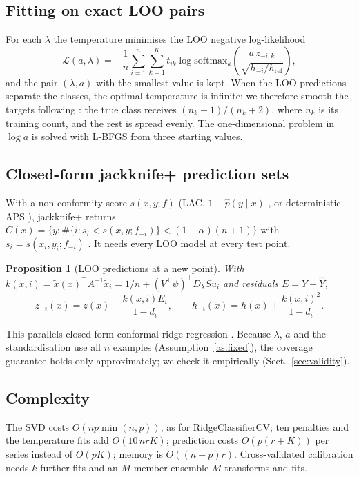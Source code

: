 \documentclass[preprint,12pt,authoryear]{elsarticle}
\newtheorem{proposition}{Proposition}
\begin{document}
\subsection{Fitting on exact LOO pairs}
For each $\lambda$ the temperature minimises the LOO negative log-likelihood
\begin{equation}\label{eq:fit}
\mathcal L(a,\lambda)=-\frac1n\sum_{i=1}^n\sum_{k=1}^K t_{ik}\log\mathrm{softmax}_k\!\left(\frac{a\,z_{-i,k}}{\sqrt{h_{-i}/h_{\mathrm{ref}}}}\right),
\end{equation}
and the pair $(\lambda,a)$ with the smallest value is kept. When the LOO predictions separate the classes, the optimal temperature is infinite; we therefore smooth the targets following \citet{platt1999}: the true class receives $(n_k+1)/(n_k+2)$, where $n_k$ is its training count, and the rest is spread evenly. The one-dimensional problem in $\log a$ is solved with L-BFGS from three starting values.

\subsection{Closed-form jackknife+ prediction sets}\label{sec:jackknife}
With a non-conformity score $s(x,y;f)$ (LAC, $1-\hat p(y\mid x)$ \citep{sadinle2019}, or deterministic APS \citep{romano2020}), jackknife+ returns $C(x)=\{y:\#\{i:s_i<s(x,y;f_{-i})\}<(1-\alpha)(n+1)\}$ with $s_i=s(x_i,y_i;f_{-i})$ \citep{barber2021}. It needs every LOO model at every test point.
\begin{proposition}[LOO predictions at a new point]\label{prop:jk}
With $k(x,i)=\tilde x(x)^\top A^{-1}\tilde x_i=1/n+(V^\top\psi)^\top D_\lambda S u_i$ and residuals $E=Y-\hat Y$,
\begin{equation}\label{eq:jk}
z_{-i}(x)=z(x)-\frac{k(x,i)E_i}{1-d_i},\qquad h_{-i}(x)=h(x)+\frac{k(x,i)^2}{1-d_i}.
\end{equation}
\end{proposition}
This parallels closed-form conformal ridge regression \citep{nouretdinov2001}. Because $\lambda$, $a$ and the standardisation use all $n$ examples (Assumption~\ref{as:fixed}), the coverage guarantee holds only approximately; we check it empirically (Sect.~\ref{sec:validity}).

\subsection{Complexity}
The SVD costs $O(np\min(n,p))$, as for RidgeClassifierCV; ten penalties and the temperature fits add $O(10\,nrK)$; prediction costs $O(p(r+K))$ per series instead of $O(pK)$; memory is $O((n+p)r)$. Cross-validated calibration needs $k$ further fits and an $M$-member ensemble $M$ transforms and fits.
\end{document}
